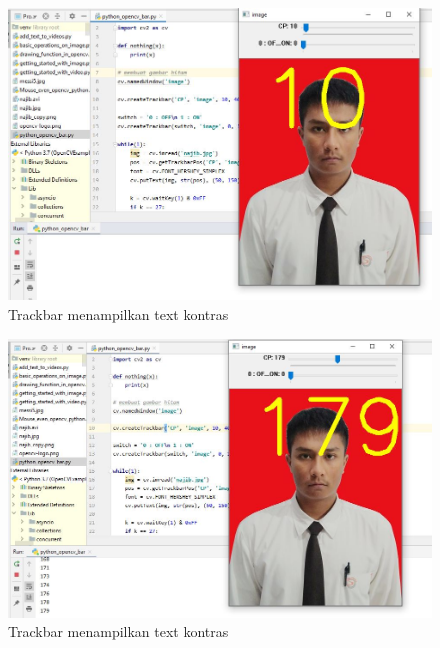 \newpage
\begin{figure}[ht]
\centering
\includegraphics[scale=0.5]{figures/2,33.jpg}
\caption{Trackbar menampilkan text kontras}
\label{contoh}
\end{figure}

\newpage
\begin{figure}[ht]
\centering
\includegraphics[scale=0.5]{figures/2,33,1.jpg}
\caption{Trackbar menampilkan text kontras}
\label{contoh}
\end{figure}


